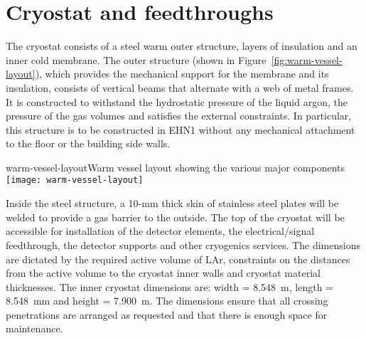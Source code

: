 
\section{Cryostat and feedthroughs}

The cryostat consists of a steel warm outer structure, layers of insulation and an inner cold membrane.  The outer %
structure (shown in Figure~\ref{fig:warm-vessel-layout}), which provides %
the mechanical support for the  %
membrane and its insulation,  consists of vertical beams that alternate with a web of metal frames. It is constructed to %
withstand the hydrostatic pressure of the liquid argon, the pressure of the gas volumes and %
satisfies the external constraints. %
In particular, this structure is to be constructed in EHN1 without any mechanical attachment to the floor or the building side walls.  
%
\begin{cdrfigure}{warm-vessel-layout}{Warm vessel layout showing the various major components}
  \texttt{[image: warm-vessel-layout]}
\end{cdrfigure}
Inside the steel structure, a 10-mm thick skin of stainless steel plates will be welded to provide a gas barrier to the outside.
The top of the cryostat will be accessible for installation of the detector elements, the electrical/signal feedthrough, the detector supports and other cryogenics services.  The dimensions %
are dictated by the required %
active volume of LAr, constraints on the distances from the active volume to the cryostat inner walls and cryostat material thicknesses.  %
The inner cryostat dimensions are: width = 8.548~m, length = 8.548~mm and height = 7.900~m. The dimensions 
ensure that all crossing penetrations are arranged as requested and that there is enough space for maintenance. 


